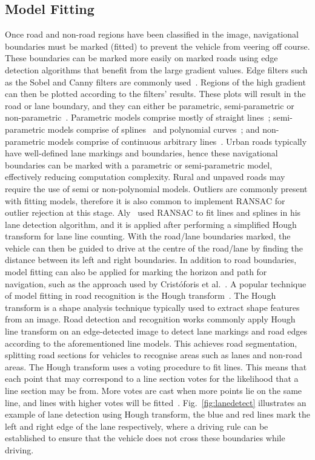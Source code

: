 \subsection{Model Fitting} \label{secmodel}
Once road and non-road regions have been classified in the image, navigational boundaries must be marked (fitted) to prevent the vehicle from veering off course. These boundaries can be marked more easily on marked roads using edge detection algorithms that benefit from the large gradient values. Edge filters such as the Sobel and Canny filters are commonly used~\cite{min_component-model_2015, c._siagian_mobile_2013, r._chen_research_2013}. Regions of the high gradient can then be plotted according to the filters' results. These plots will result in the road or lane boundary, and they can either be parametric, semi-parametric or non-parametric~\cite{bar_hillel_recent_2014}. Parametric models comprise mostly of straight lines~\cite{h._kong_general_2010}; semi-parametric models comprise of splines~\cite{wang_lane_2000} and polynomial curves~\cite{z._tao_lane_2013,m._revilloud_improved_2013}; and non-parametric models comprise of continuous arbitrary lines~\cite{cristoforis_real-time_2016}. Urban roads typically have well-defined lane markings and boundaries, hence these navigational boundaries can be marked with a parametric or semi-parametric model, effectively reducing computation complexity. Rural and unpaved roads may require the use of semi or non-polynomial models. Outliers are commonly present with fitting models, therefore it is also common to implement RANSAC for outlier rejection at this stage. Aly~\cite{m._aly_real_2008} used RANSAC to fit lines and splines in his lane detection algorithm, and it is applied after performing a simplified Hough transform for lane line counting. With the road/lane boundaries marked, the vehicle can then be guided to drive at the centre of the road/lane by finding the distance between its left and right boundaries. In addition to road boundaries, model fitting can also be applied for marking the horizon and path for navigation, such as the approach used by Crist\'{o}foris et al.~\cite{cristoforis_real-time_2016}. A popular technique of model fitting in road recognition is the Hough transform~\cite{richard_o._duda_use_1972}. The Hough transform is a shape analysis technique typically used to extract shape features from an image. Road detection and recognition works commonly apply Hough line transform on an edge-detected image to detect lane markings and road edges according to the aforementioned line models. This achieves road segmentation, splitting road sections for vehicles to recognise areas such as lanes and non-road areas. The Hough transform uses a voting procedure to fit lines. This means that each point that may correspond to a line section votes for the likelihood that a line section may be from. More votes are cast when more points lie on the same line, and lines with higher votes will be fitted~\cite{muhammad_opencv_2015}. Fig.~\ref{fig:lanedetect} illustrates an example of lane detection using Hough transform, the blue and red lines mark the left and right edge of the lane respectively, where a driving rule can be established to ensure that the vehicle does not cross these boundaries while driving. 